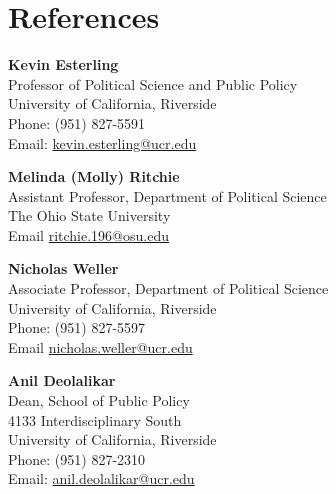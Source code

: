 \documentclass[letterpaper,11pt]{article}
\newcommand{\ucr}{University of California, Riverside}
\begin{document}
\vspace{.25cm}


\section{References}

\textbf{Kevin Esterling} \\
Professor of Political Science and Public Policy \\
\ucr \\
Phone: (951) 827-5591 \\
Email: \href{mailto:kevin.esterling@ucr.edu}{kevin.esterling@ucr.edu}

\bigskip

\textbf{Melinda (Molly) Ritchie} \\
Assistant Professor, Department of Political Science \\
The Ohio State University \\
Email \href{mailto:ritchie.196@osu.edu}{ritchie.196@osu.edu}

\bigskip

\textbf{Nicholas Weller} \\
Associate Professor, Department of Political Science \\
\ucr \\
Phone: (951) 827-5597 \\
Email \href{mailto:nicholas.weller@ucr.edu}{nicholas.weller@ucr.edu}  

\bigskip

\textbf{Anil Deolalikar} \\
Dean, School of Public Policy \\
4133 Interdisciplinary South \\
\ucr \\
Phone: (951) 827-2310 \\
Email: \href{mailto:anil.deolalikar@ucr.edu}{anil.deolalikar@ucr.edu}
\end{document}
